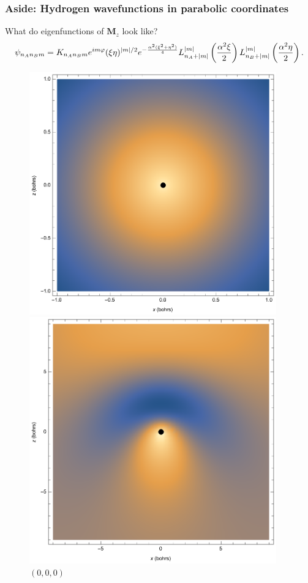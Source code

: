\documentclass{beamer}
\theoremstyle{definition}
\newcommand{\lp}{\left(}
\newcommand{\rp}{\right)}
\newcommand{\f}[2]{\frac{#1}{#2}}
\newcommand{\al}{\alpha}
\begin{document}
\begin{frame}
\frametitle{Aside: Hydrogen wavefunctions in parabolic coordinates}

What do eigenfunctions of $\mathbf{M}_z$ look like? 
\begin{align*}
\psi_{n_A n_B m} = K_{n_An_B m} e^{im\varphi} (\xi \eta)^{\abs{m}/2}  e^{ -\f{\al^2(\xi^2 + \eta^2)}{4}}
L_{n_A + \abs{m}}^{\abs{m}} \lp\f{\al^2 \xi}{2} \rp
L_{n_B + \abs{m}}^{\abs{m}} \lp\f{\al^2 \eta}{2} \rp.
\end{align*}

\pause

\begin{figure}[!htb]
\begin{minipage}{0.24\textwidth}
\includegraphics[width=0.95\textwidth]{figures/000.eps}
\caption*{$(0,0,0)$}
\end{minipage}
\begin{minipage}{0.24\textwidth}
\includegraphics[width=0.95\textwidth]{figures/200.eps}

\end{minipage}
\end{figure}
\end{frame}
\end{document}

